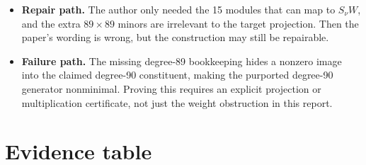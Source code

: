 \documentclass[11pt]{article}
\begin{document}
\begin{itemize}
  \item \textbf{Repair path.}  The author only needed the 15 modules that can
  map to \(S_\nu W\), and the extra \(89\times89\) minors are irrelevant to the
  target projection.  Then the paper's wording is wrong, but the construction
  may still be repairable.
  \item \textbf{Failure path.}  The missing degree-89 bookkeeping hides a
  nonzero image into the claimed degree-90 constituent, making the purported
  degree-90 generator nonminimal.  Proving this requires an explicit
  projection or multiplication certificate, not just the weight obstruction in
  this report.
\end{itemize}

\section{Evidence table}
\end{document}
